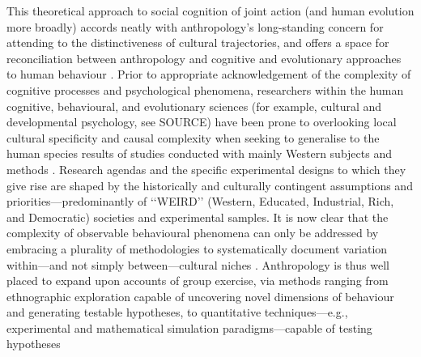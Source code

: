 
This theoretical approach to social cognition of joint action (and human evolution more broadly) accords neatly with anthropology's long-standing concern for attending to the distinctiveness of cultural trajectories, and offers a space for reconciliation between anthropology and cognitive and evolutionary approaches to human behaviour \citep{Whitehouse2012}.  Prior to appropriate acknowledgement of the complexity of cognitive processes and psychological phenomena, researchers within the human cognitive, behavioural, and evolutionary sciences (for example, cultural and developmental psychology, see SOURCE) have been prone to overlooking local cultural specificity and causal complexity when seeking to generalise to the human species results of studies conducted with mainly Western subjects and methods \citep{Henrich2010d}.  Research agendas and the specific experimental designs to which they give rise are shaped by the historically and culturally contingent assumptions and priorities---predominantly of ‘‘WEIRD’’ (Western, Educated, Industrial, Rich, and Democratic) societies and experimental samples.  It is now clear that the complexity of observable behavioural phenomena can only be addressed by embracing a plurality of methodologies to systematically document variation within---and not simply between---cultural niches \citep{Fuentes2016}.  Anthropology is thus well placed to expand upon accounts of group exercise, via methods ranging from ethnographic exploration capable of uncovering novel dimensions of behaviour and generating testable hypotheses, to quantitative techniques---e.g., experimental and mathematical simulation paradigms---capable of testing hypotheses

